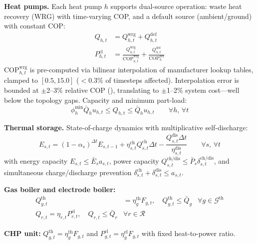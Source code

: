 \documentclass[review,3p]{elsarticle}
\begin{document}
\textbf{Heat pumps.} Each heat pump $h$ supports dual-source
operation: waste heat recovery (WRG) with time-varying COP, and a
default source (ambient/ground) with constant COP:
\begin{align}
Q_{h,t} &= Q_{h,t}^{\mathrm{wrg}} + Q_{h,t}^{\mathrm{def}}
\label{eq:hp_split} \\
P_{h,t}^{\mathrm{el}} &= \frac{Q_{h,t}^{\mathrm{wrg}}}{
\mathrm{COP}_{h,t}^{\mathrm{wrg}}}
+ \frac{Q_{h,t}^{\mathrm{def}}}{\mathrm{COP}_h^{\mathrm{def}}}
\label{eq:hp_pel}
\end{align}
$\mathrm{COP}_{h,t}^{\mathrm{wrg}}$ is pre-computed via bilinear
interpolation of manufacturer lookup tables, clamped to $[0.5, 15.0]$
($<$0.3\% of timesteps affected). Interpolation error is bounded at
$\pm$2--3\% relative COP (), translating to $\pm$1--2\%
system cost---well below the topology gaps. Capacity and minimum
part-load:
\begin{equation}
\phi_h^{\mathrm{min}} \bar{Q}_h u_{h,t} \leq Q_{h,t}
\leq \bar{Q}_h u_{h,t}
\qquad \forall h,\, \forall t
\label{eq:hp_cap}
\end{equation}

\textbf{Thermal storage.} State-of-charge dynamics with
multiplicative self-discharge:
\begin{equation}
E_{s,t} = (1-\alpha_s)^{\Delta t} E_{s,t-1}
+ \eta_{s,t}^{\mathrm{ch}} Q_{s,t}^{\mathrm{ch}} \Delta t
- \frac{Q_{s,t}^{\mathrm{dis}} \Delta t}{\eta_{s,t}^{\mathrm{dis}}}
\qquad \forall s,\, \forall t
\label{eq:storage_soc}
\end{equation}
with energy capacity $E_{s,t} \leq \bar{E}_s a_{s,t}$, power
capacity $Q_{s,t}^{\mathrm{ch/dis}} \leq \bar{P}_s
\delta_{s,t}^{\mathrm{ch/dis}}$, and simultaneous charge/discharge
prevention $\delta_{s,t}^{\mathrm{ch}} + \delta_{s,t}^{\mathrm{dis}}
\leq a_{s,t}$.

\textbf{Gas boiler and electrode boiler:}
\begin{align}
Q_{g,t}^{\mathrm{th}} &= \eta_g^{\mathrm{th}} F_{g,t},
\quad Q_{g,t}^{\mathrm{th}} \leq \bar{Q}_g
& \forall g \in \mathcal{G}^{\mathrm{th}}
\label{eq:gen_thermal} \\
Q_{r,t} = \eta_{r,t} P_{r,t}^{\mathrm{el}},
\quad Q_{r,t} \leq \bar{Q}_r
& \forall r \in \mathcal{R}
\label{eq:p2h}
\end{align}

\textbf{CHP unit:}
$Q_{g,t}^{\mathrm{th}} = \eta_g^{\mathrm{th}} F_{g,t}$ and
$P_{g,t}^{\mathrm{el}} = \eta_g^{\mathrm{el}} F_{g,t}$ with
fixed heat-to-power ratio.
\end{document}
